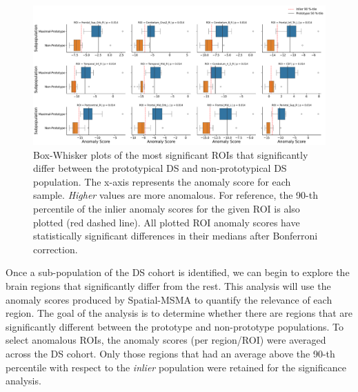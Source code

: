 \begin{figure}[tbhp]
\centering
\includegraphics[width=\textwidth]{figures/roi_boxplot.pdf}
\caption{Box-Whisker plots of the most significant ROIs that significantly differ between the prototypical DS and non-prototypical DS population. The x-axis represents the anomaly score for each sample. \textit{Higher} values are more anomalous. For reference, the 90-th percentile of the inlier anomaly scores for the given ROI is also plotted (red dashed line). All plotted ROI anomaly scores have statistically significant differences in their medians after Bonferroni correction. }
\label{fig:roi-box-ds}
\end{figure}


Once a sub-population of the DS cohort is identified, we can begin to explore the brain regions that significantly differ from the rest.  This analysis will use the anomaly scores produced by Spatial-MSMA to quantify the relevance of each region. The goal of the analysis is to determine whether there are regions that are significantly different between the prototype and non-prototype populations. To select anomalous ROIs, the anomaly scores (per region/ROI) were averaged across the DS cohort. Only those regions that had an average above the 90-th percentile with respect to the \textit{inlier} population were retained for the significance analysis.

